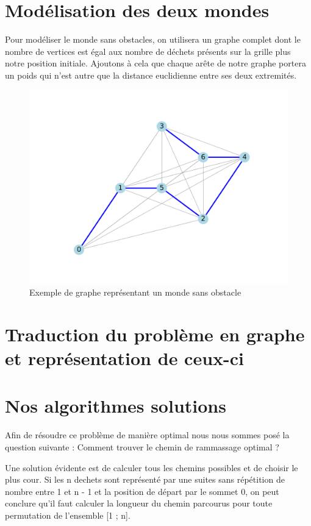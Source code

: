 \documentclass{report}
\begin{document}
\section{\Large Mod\'elisation des deux mondes}
\hspace{0,5 cm} \Large Pour mod\'eliser le monde sans obstacles, on utilisera un graphe complet dont le nombre de vertices est \'egal aux nombre de d\'echets pr\'esents sur la grille plus notre 
position initiale. Ajoutons \`a cela que chaque ar\^ete de notre graphe portera un poids qui n'est autre que la distance euclidienne entre ses deux extremit\'es.
\begin{figure}[!h]
    \centerline{\includegraphics[scale=1]{best_path_arbitrary-1.png}}
    \caption{Exemple de graphe repr\'esentant un monde sans obstacle} 
  \end{figure}



\section{Traduction du problème en graphe et représentation de ceux-ci}

\section{Nos algorithmes solutions}

Afin de résoudre ce problème de manière optimal nous nous sommes posé la question suivante : Comment trouver le chemin de rammassage optimal ?

Une solution évidente est de calculer tous les chemins possibles et de choisir le plus cour. Si les n dechets sont représenté par une suites sans répétition de nombre entre 1 et n - 1 et la position de départ par le sommet 0, on peut conclure qu'il faut calculer la longueur du chemin parcourus pour toute permutation de l'ensemble [1 ; n].
\end{document}
